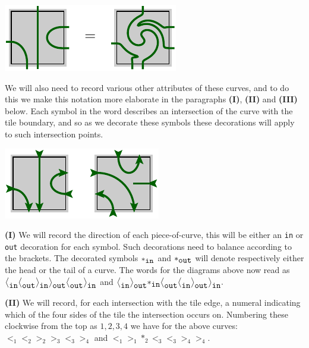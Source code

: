 \documentclass[aps, prl, letterpaper, twocolumn, superscriptaddress, notitlepage, 10pt]{revtex4-1}
\begin{document}
\begin{center}
\includegraphics[]{pic-cells-0.pdf}
\end{center}

We will also need to record
various other attributes of these curves,
and to do this we make this notation more elaborate
in the paragraphs {\bf (I)}, {\bf(II)} and {\bf(III)} below.
Each symbol in the word describes an intersection of
the curve with the tile boundary,
and so as we decorate these symbols these decorations will
apply to such intersection points.

\begin{center}
\includegraphics[]{pic-cells-1.pdf}
\end{center}

{\bf (I)} We will record the direction of each piece-of-curve,
this will be either an {\tt in} or {\tt out} decoration for each symbol.
Such decorations need to balance according to the brackets.
The decorated symbols $*_{\mbox{\tt in}}$ and 
$*_{\mbox{\tt out}}$ 
will denote respectively either
the head or the tail of a curve.
The words for the diagrams above now read as
$ \bigl<_{\mbox{\tt in}}\bigl<_{\mbox{\tt out}}\bigr>_{\mbox{\tt in}}
    \bigr>_{\mbox{\tt out}}\bigl<_{\mbox{\tt out}}\bigr>_{\mbox{\tt in}}$
and
$ \bigl<_{\mbox{\tt in}}\bigl>_{\mbox{\tt out}}*_{\mbox{\tt in}}
    \bigr<_{\mbox{\tt out}}
    \bigr<_{\mbox{\tt in}}\bigl>_{\mbox{\tt out}}\bigr>_{\mbox{\tt in}}.
$

{\bf (II)} We will record,
for each intersection with the tile edge, 
a numeral indicating which of the four
sides of the tile the
intersection occurs on.
Numbering these clockwise from the top as $1, 2, 3, 4$ we have for the above curves: 
$\bigl<_1\bigl<_2\bigr>_2\bigr>_3\bigl<_3\bigr>_4$ 
and $\bigl<_1\bigr>_1*_2\bigl<_3\bigl<_3\bigr>_4\bigr>_4.$
\end{document}
